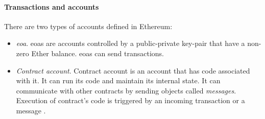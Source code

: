 \paragraph{Transactions and accounts}
There are two types of accounts defined in Ethereum:
\begin{itemize}[noitemsep]
    \item \textit{\acrfull{eoa}}. \acrshort{eoa}s are accounts controlled by a public-private key-pair that have a non-zero Ether balance. \acrshort{eoa}s can send transactions. \cite{EthereumCommunityEthereumDocumentation}
    \item \textit{Contract account}. Contract account is an account that has code associated with it. It can run its code and maintain its internal state. It can communicate with other contracts by sending objects called \textit{messages}. Execution of contract's code is triggered by an incoming transaction or a message \cite{EthereumCommunityEthereumDocumentation}.
\end{itemize}



